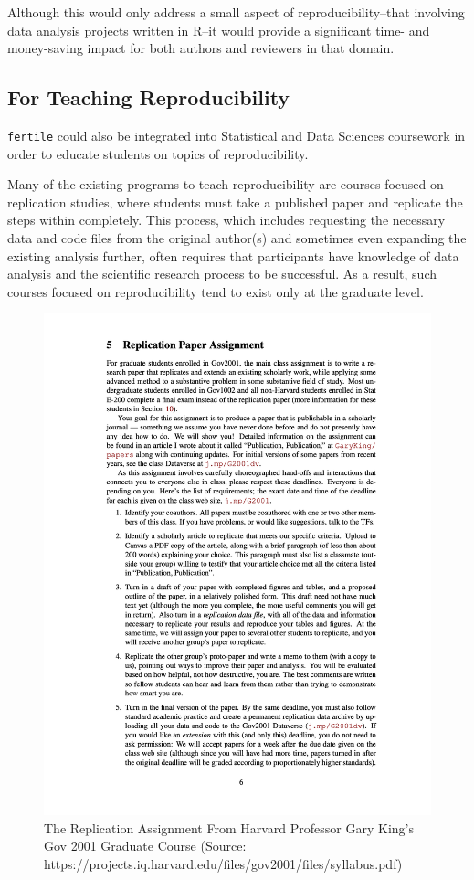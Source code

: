 \documentclass[12pt,twoside]{reedthesis}
\begin{document}
Although this would only address a small aspect of reproducibility--that
involving data analysis projects written in R--it would provide a
significant time- and money-saving impact for both authors and reviewers
in that domain.

\subsection{For Teaching
Reproducibility}\label{for-teaching-reproducibility}

\texttt{fertile} could also be integrated into Statistical and Data
Sciences coursework in order to educate students on topics of
reproducibility.

Many of the existing programs to teach reproducibility are courses
focused on replication studies, where students must take a published
paper and replicate the steps within completely. This process, which
includes requesting the necessary data and code files from the original
author(s) and sometimes even expanding the existing analysis further,
often requires that participants have knowledge of data analysis and the
scientific research process to be successful. As a result, such courses
focused on reproducibility tend to exist only at the graduate level.
\begin{figure}
\includegraphics[width=1\linewidth]{figure/gov-2001-replication} \caption{The Replication Assignment From Harvard Professor Gary King's Gov 2001 Graduate Course (Source: https://projects.iq.harvard.edu/files/gov2001/files/syllabus.pdf)}\label{fig:unnamed-chunk-44}
\end{figure}
\end{document}
